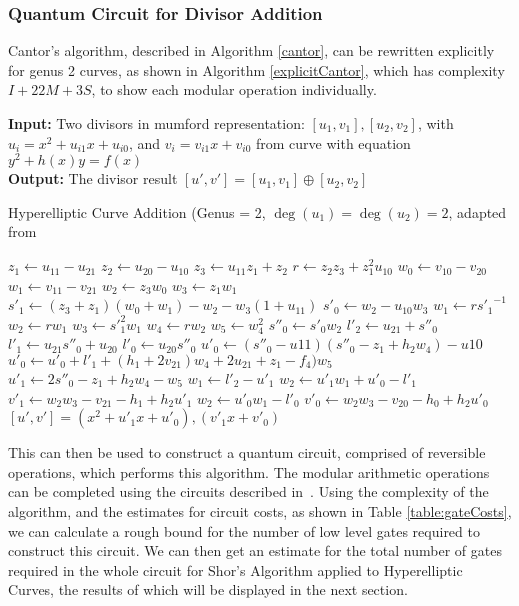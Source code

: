 \subsubsection{Quantum Circuit for Divisor Addition}
Cantor's algorithm, described in Algorithm \ref{cantor}, can be rewritten explicitly for genus 2 curves, as shown in Algorithm \ref{explicitCantor}, which has complexity $I + 22M + 3S$, to show each modular operation individually.
\begin{algorithm}[!htb]
\textbf{Input:} Two divisors in mumford representation: $[u_1, v_1], [u_2, v_2]$, with $u_i = x^2 +u_{i1}x + u_{i0}$, and $v_i = v_{i1}x + v_{i0}$ from curve with equation $y^2 + h(x)y = f(x)$\\
\textbf{Output:} The divisor result $[u',v'] = [u_1,v_1] \oplus [u_2,v_2]$ 
\caption{Hyperelliptic Curve Addition (Genus = 2, $\deg(u_1) = \deg(u_2) = 2$, adapted from~\cite{cohen2005handbook}}\label{explicitCantor}
\algrule
\begin{algorithmic}[1]
\State $z_1 \longleftarrow u_{11} - u_{21}$
\State $z_2 \longleftarrow u_{20} - u_{10}$
\State $z_3 \longleftarrow u_{11}z_1 + z_2$
\State $r \longleftarrow z_2z_3 + z_1^2u_{10}$
\State $w_0 \longleftarrow v_{10} - v_{20}$
\State $w_1 \longleftarrow v_{11} - v_{21}$
\State $w_2 \longleftarrow z_3w_0$
\State $w_3 \longleftarrow z_1w_1$
\State $s'_1 \longleftarrow (z_3 + z_1)(w_0+w_1)-w_2-w_3(1+u_{11})$
\State $s'_0 \longleftarrow w_2-u_{10}w_3$
\State $w_1 \longleftarrow {rs'_1}^{-1}$
\State $w_2 \longleftarrow rw_1$
\State $w_3 \longleftarrow {s'}_1^2w_1$
\State $w_4 \longleftarrow rw_2$
\State $w_5 \longleftarrow w_4^2$
\State $s''_0 \longleftarrow s'_0w_2$
\State $l'_2 \longleftarrow u_{21} + s''_0$
\State $l'_1 \longleftarrow u_{21}s''_0 + u_{20}$
\State $l'_0 \longleftarrow u_{20}s''_0$
\State $u'_0 \longleftarrow (s''_0-u{11})(s''_0 - z_1 + h_2w_4) - u{10}$
\State $u'_0 \longleftarrow u'_0+l'_1 + (h_1 + 2v_{21})w_4 + 2u_{21} + z_1 - f_4)w_5$
\State $u'_1 \longleftarrow 2s''_0 - z_1 + h_2w_4 - w_5$
\State $w_1 \longleftarrow l'_2 - u'_1$
\State $w_2 \longleftarrow u'_1w_1 + u'_0 - l'_1$
\State $v'_1 \longleftarrow w_2w_3 - v_{21} - h_1 + h_2u'_1$
\State $w_2 \longleftarrow u'_0w_1 - l'_0$
\State $v'_0 \longleftarrow w_2w_3 - v_{20} - h_0 +h_2u'_0$
\Return $[u', v'] = (x^2 + u'_1x + u'_0), (v'_1x + v'_0)$
\end{algorithmic}
\end{algorithm} This can then be used to construct a quantum circuit, comprised of reversible operations, which performs this algorithm. The modular arithmetic operations can be completed using the circuits described in~\cite{roetteler2017quantum}. Using the complexity of the algorithm, and the estimates for circuit costs, as shown in Table \ref{table:gateCosts}, we can calculate a rough bound for the number of low level gates required to construct this circuit. We can then get an estimate for the total number of gates required in the whole circuit for Shor's Algorithm applied to Hyperelliptic Curves, the results of which will be displayed in the next section.
